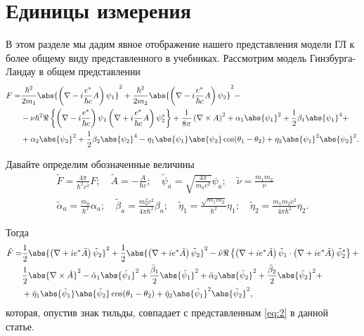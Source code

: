 \chapter{Единицы измерения}
\label{ch:A}

В этом разделе мы дадим явное отображение нашего представления модели
ГЛ к более общему виду представленного в учебниках. Рассмотрим модель
Гинзбурга-Ландау в общем представлении
\begin{align}
  F = & \frac{\hbar^2}{2m_1} \abs{\left( \nabla - i\frac{e^*}{\hbar c} A\right)
    \psi_1}^2 + \frac{\hbar^2}{2m_2} \abs{\left( \nabla - i\frac{e^*}{\hbar c}A
    \right) \psi_2}^2 - \nonumber \\
  & - \nu\hbar^2 \Re\left\{ \left( \nabla - i\frac{e^*}{\hbar c}
    \right)\psi_1 \left( \nabla + i\frac{e^*}{\hbar c}A \right)
    \psi^*_2\right\} + \frac{1}{8\pi}\left( \nabla\times A \right)^2 +
    \alpha_1\abs{\psi_1}^2 + \frac{1}{2}\beta_1\abs{\psi_1}^4 + \nonumber \\
  & + \alpha_2\abs{\psi_2}^2 + \frac{1}{2}
    \beta_2\abs{\psi_2}^4 - \eta_1\abs{\psi_1}\abs{\psi_2}
    \cos(\theta_1 - \theta_2) + \eta_2\abs{\psi_1}^2\abs{\psi_2}^2.
    \label{eq:A-1}
\end{align}

Давайте определим обозначенные величины
\begin{gather}
  \tilde{F} = \frac{4\pi}{\hbar^2 c^2}F; \quad
    \tilde{A} = -\frac{A}{\hbar c}; \quad
    \tilde{\psi}_a = \sqrt{\frac{4\pi}{m_a c^2}}\psi_a; \quad
    \tilde{\nu} = \frac{m_1m_2}\nu \nonumber \\
  \tilde{\alpha}_a = \frac{m_a}{\hbar^2}\alpha_a; \quad
    \tilde{\beta}_a = \frac{m^2_a c^2}{4\pi\hbar^2}\beta_a; \quad
    \tilde{\eta}_1 = \frac{\sqrt{m_1 m_2}}{\hbar^2}\eta_1; \quad
    \tilde{\eta}_2 = \frac{m_1 m_2 c^2}{4\pi\hbar^2}\eta_2. \label{eq:A-2}
\end{gather}

Тогда
\begin{align}
  \tilde{F} = & \frac{1}{2}\abs{\left( \nabla + ie^*\tilde{A} \right)
    \tilde{\psi}_2}^2 + \frac{1}{2}\abs{\left( \nabla + ie^*\tilde{A} \right)
    \tilde{\psi}_2}^2 - \tilde{\nu} \Re\left\{ \left( \nabla + ie^*\tilde{A}
    \right)\tilde{\psi}_1 \cdot \left( \nabla + ie^*\tilde{A} \right)
    \tilde{\psi}^*_2 \right\} + \nonumber \\
  & \frac{1}{2}\abs{\nabla\times\tilde{A}}^2 - \tilde{\alpha}_1
    \abs{\tilde{\psi}_1}^2 + \frac{\tilde{\beta}_1}{2}\abs{\tilde{\psi}_1}^2 +
    \tilde{\alpha}_2\abs{\tilde{\psi}_2}^2 +
    \frac{\tilde{\beta}_2}{2}\abs{\tilde{\psi}_2}^2 + \nonumber \\
  & + \tilde{\eta}_1 \abs{\tilde{\psi}_1} \abs{\tilde{\psi}_2}
    \cos(\theta_1 - \theta_2) + \tilde{\eta}_2\abs{\tilde{\psi}_1}^2
    \abs{\tilde{\psi}_2}^2, \label{eq:A-3}
\end{align}
которая, опустив знак тильды, совпадает с представленным \eqref{eq:2} в
данной статье.

